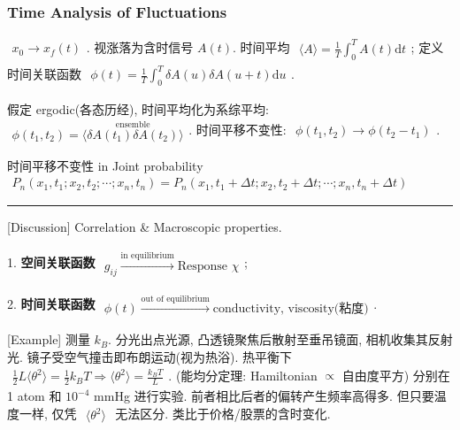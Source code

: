 \documentclass[../../main.tex]{subfiles}
\begin{document}
\subsubsection{Time Analysis of Fluctuations}
$\begin{aligned}
    x_{0}\rightarrow x_{f}(t)
\end{aligned}$. 视涨落为含时信号 $A(t)$. 时间平均 $\begin{aligned}
    \langle A\rangle = \frac{1}{T}\int_{0}^{T}A(t)\mathrm{d}t
\end{aligned}$; 定义时间关联函数 $\begin{aligned}
    \phi(t) = \frac{1}{T}\int_{0}^{T}\delta A(u)\delta A(u+t)\mathrm{d}u
\end{aligned}$. 

假定 ergodic(各态历经), 时间平均化为系综平均: $\begin{aligned}
    \phi(t_{1},t_{2}) = \stackrel{\text{ensemble}}{\langle\delta A(t_{1})\delta A(t_{2})\rangle}
\end{aligned}$. 时间平移不变性: $\begin{aligned}
    \phi(t_{1},t_{2}) \rightarrow \phi(t_{2}-t_{1})
\end{aligned}$. 

时间平移不变性 in Joint probability $\begin{aligned}
    P_{n}(x_{1},t_{1};x_{2},t_{2};\cdots;x_{n},t_{n}) = P_{n}(x_{1},t_{1}+\Delta t;x_{2},t_{2}+\Delta t;\cdots;x_{n},t_{n}+\Delta t) 
\end{aligned}$

\vspace{0.3em}\hrule\vspace{0.3em}

[Discussion] Correlation \& Macroscopic properties.

1. \textbf{空间关联函数} $\begin{aligned}
    g_{ij}\stackrel{\text{in equilibrium}}{\longrightarrow}\text{Response }\chi
\end{aligned}$;

2. \textbf{时间关联函数} $\begin{aligned}
    \phi(t) \stackrel{\text{out of equilibrium}}{\longrightarrow}\text{conductivity, viscosity(粘度)}
\end{aligned}$. 

[Example] 测量 $k_{B}$. 分光出点光源, 凸透镜聚焦后散射至垂吊镜面, 相机收集其反射光. 镜子受空气撞击即布朗运动(视为热浴). 热平衡下 $\begin{aligned}
    \frac{1}{2}L\langle\theta^{2}\rangle = \frac{1}{2}k_{B}T\Rightarrow \langle \theta^{2}\rangle = \frac{k_{B}T}{L}
\end{aligned}$. (能均分定理: Hamiltonian $\propto$ 自由度平方) 分别在 1 atom 和 $10^{-4}$ mmHg 进行实验. 前者相比后者的偏转产生频率高得多. 但只要温度一样, 仅凭 $\begin{aligned}
    \langle\theta^{2}\rangle
\end{aligned}$ 无法区分. 类比于价格/股票的含时变化. 
\end{document}
